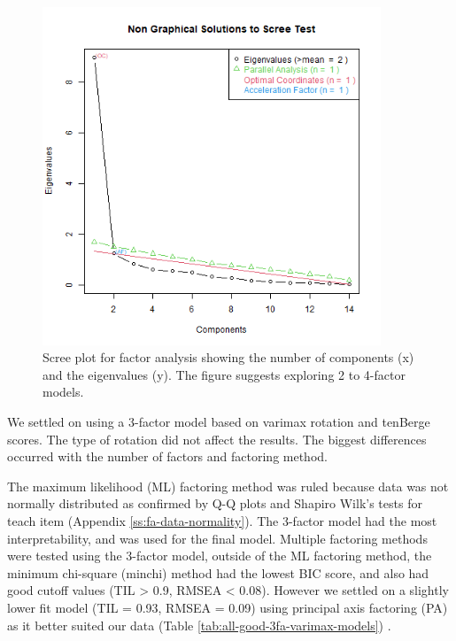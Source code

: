 \documentclass[020-persona\_validation.tex]{subfiles}
\begin{document}
        \begin{figure}[htb]
            \centering
            \includegraphics[width=0.9\textwidth]{figs/010-validation/efa_eigen_scree_good.png}
            \caption[Scree plot for factor analysis]
            {Scree plot for factor analysis showing the number of components (x) and the eigenvalues (y).
                The figure suggests exploring 2 to 4-factor models.
            }
            \label{fig:scree-fa-good}
        \end{figure}

        We settled on using a 3-factor model based on
        varimax rotation and
        tenBerge scores.
        The type of rotation did not affect the results.
        The biggest differences occurred with the number of factors and factoring method.

        The maximum likelihood (ML) factoring method was ruled because data was not normally distributed
        as confirmed by Q-Q plots and Shapiro Wilk's tests for teach item (Appendix \ref{ss:fa-data-normality}).
        The 3-factor model had the most interpretability, and was used for the final model.
        Multiple factoring methods were tested using the 3-factor model,
        outside of the ML factoring method, the minimum chi-square (minchi) method had the lowest BIC score,
        and also had good cutoff values (TIL > 0.9, RMSEA < 0.08).
        However we settled on a slightly lower fit model (TIL = 0.93, RMSEA = 0.09) using principal axis factoring (PA)
        as it better suited our data (Table \ref{tab:all-good-3fa-varimax-models})
        \cite{arifinExploratoryFactorAnalysis2017}.
\end{document}

